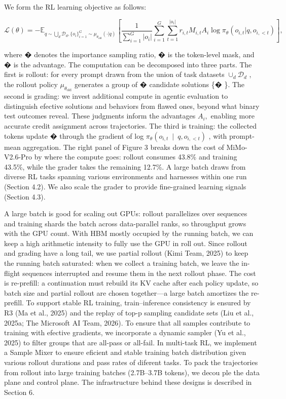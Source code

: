 \documentclass[
  10
]{article}
\begin{document}
We form the RL learning objective as follows:

\[
\mathcal {L} (\theta) = - \mathbb {E} _ {q \sim \bigcup_ {d} \mathcal {D} _ {d}, \{o _ {i} \} _ {i = 1} ^ {G} \sim \mu_ {\theta_ {\mathrm{old}}} (\cdot | q)} \left[ \frac {1}{\sum_ {i = 1} ^ {G} | o _ {i} |} \sum_ {i = 1} ^ {G} \sum_ {t = 1} ^ {| o _ {i} |} r _ {i, t} M _ {i, t} A _ {i} \log \pi_ {\theta} (o _ {i, t} | q, o _ {i, <   t}) \right],\tag{1}
\]

where � denotes the importance sampling ratio, � is the token-level
mask, and � is the advantage. The computation can be decomposed into
three parts. The first is rollout: for every prompt drawn from the union
of task datasets \(\cup _ { d } \mathcal { D } _ { d }\) , the rollout
policy \(\mu _ { \theta _ { \mathrm { o l d } } }\) generates a group of
� candidate solutions \{� \}. The second is grading: we invest
additional compute in agentic evaluation to distinguish efective
solutions and behaviors from flawed ones, beyond what binary test
outcomes reveal. These judgments inform the advantages \(A _ { i } ,\)
enabling more accurate credit assignment across trajectories. The third
is training: the collected tokens update � through the gradient of log
\(\pi _ { \theta } ( o _ { i , t } ~ \mid ~ q , o _ { i , < t } )\) ,
with prompt-mean aggregation. The right panel of Figure 3 breaks down
the cost of MiMo-V2.6-Pro by where the compute goes: rollout consumes
43.8\% and training 43.5\%, while the grader takes the remaining 12.7\%.
A large batch draws from diverse RL tasks spanning various environments
and harnesses within one run (Section 4.2). We also scale the grader to
provide fine-grained learning signals (Section 4.3).

A large batch is good for scaling out GPUs: rollout parallelizes over
sequences and training shards the batch across data-parallel ranks, so
throughput grows with the GPU count. With HBM mostly occupied by the
running batch, we can keep a high arithmetic intensity to fully use the
GPU in roll out. Since rollout and grading have a long tail, we use
partial rollout (Kimi Team, 2025) to keep the running batch saturated:
when we collect a training batch, we leave the in-flight sequences
interrupted and resume them in the next rollout phase. The cost is
re-prefill: a continuation must rebuild its KV cache after each policy
update, so batch size and partial rollout are chosen together---a large
batch amortizes the re-prefill. To support stable RL training,
train--inference consistency is ensured by R3 (Ma et al., 2025) and the
replay of top-p sampling candidate sets (Liu et al., 2025a; The
Microsoft AI Team, 2026). To ensure that all samples contribute to
training with efective gradients, we incorporate a dynamic sampler (Yu
et al., 2025) to filter groups that are all-pass or all-fail. In
multi-task RL, we implement a Sample Mixer to ensure eficient and stable
training batch distribution given various rollout durations and pass
rates of diferent tasks. To pack the trajectories from rollout into
large training batches (2.7B--3.7B tokens), we decou ple the data plane
and control plane. The infrastructure behind these designs is described
in Section 6.
\end{document}

